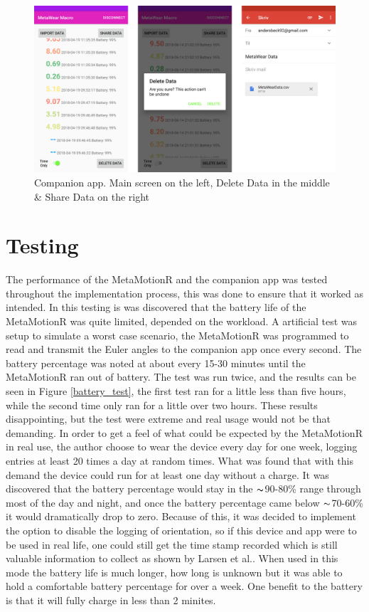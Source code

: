 \begin{figure}[h!]
    \centering
    \includegraphics[width=1\textwidth]{figures/proto_s1.png}
    \caption{Companion app. Main screen on the left, Delete Data in the middle \& Share Data on the right}
    \label{proto_s1}
\end{figure}



\section{Testing}
The performance of the MetaMotionR and the companion app was tested throughout the implementation process, this was done to ensure that it worked as intended. In this testing is was discovered that the battery life of the MetaMotionR was quite limited, depended on the workload. A artificial test was setup to simulate a worst case scenario, the MetaMotionR was programmed to read and transmit the Euler angles to the companion app once every second. The battery percentage was noted at about every 15-30 minutes until the MetaMotionR ran out of battery. The test was run twice, and the results can be seen in Figure \ref{battery_test}, the first test ran for a little less than five hours, while the second time only ran for a little over two hours. These results disappointing, but the test were extreme and real usage would not be that demanding. In order to get a feel of what could be expected by the MetaMotionR in real use, the author choose to wear the device every day for one week, logging entries at least 20 times a day at random times. What was found that with this demand the device could run for at least one day without a charge. It was discovered that the battery percentage would stay in the $\thicksim$90-80\% range through most of the day and night, and once the battery percentage came below $\thicksim$70-60\% it would dramatically drop to zero. Because of this, it was decided to implement the option to disable the logging of orientation, so if this device and app were to be used in real life, one could still get the time stamp recorded which is still valuable information to collect as shown by Larsen et al.\cite{eg}. When used in this mode the battery life is much longer, how long is unknown but it was able to hold a comfortable battery percentage for over a week. One benefit to the battery is that it will fully charge in less than 2 minites.

